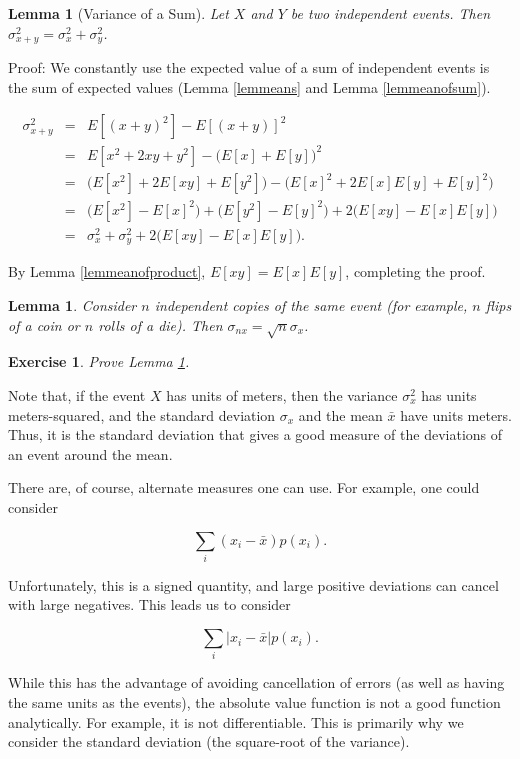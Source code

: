 \documentclass[12pt,letterpaper]{report}
\newcommand\be{\begin{equation}}
\newcommand\ee{\end{equation}}
\newcommand\bea{\begin{eqnarray}}
\newcommand\eea{\end{eqnarray}}
\newtheorem{lem}[thm]{Lemma}
\newtheorem{exe}[thm]{Exercise}
\begin{document}
\begin{lem}[Variance of a Sum] Let $X$ and $Y$ be two independent
events. Then $\sigma^2_{x+y} = \sigma^2_x + \sigma^2_y$.
\end{lem}

Proof: We constantly use the expected value of a sum of
independent events is the sum of expected values (Lemma
\ref{lemmeans} and Lemma \ref{lemmeanofsum}).

\bea \sigma^2_{x+y} &=& E[(x+y)^2] - E[(x+y)]^2 \nonumber\\ &=&
E[x^2 + 2xy + y^2] - \Big(E[x] + E[y]\Big)^2 \nonumber\\ &=&
\Big(E[x^2] + 2E[xy] + E[y^2]\Big) - \Big(E[x]^2 + 2E[x]E[y] +
E[y]^2\Big) \nonumber\\ &=& \Big(E[x^2] - E[x]^2\Big) +
\Big(E[y^2] - E[y]^2\Big) + 2\Big(E[xy] - E[x]E[y] \Big)
\nonumber\\ &=& \sigma^2_x + \sigma^2_y + 2\Big(E[xy] - E[x]E[y]
\Big). \eea

By Lemma \ref{lemmeanofproduct}, $E[xy] = E[x]E[y]$, completing
the proof.

\begin{lem}\label{lemumvariances} Consider $n$ independent copies of
the same event (for example, $n$ flips of a coin or $n$ rolls of a
die). Then $\sigma_{nx} = \sqrt{n} \sigma_x$.
\end{lem}

\begin{exe} Prove Lemma \ref{lemumvariances}. \end{exe}


Note that, if the event $X$ has units of meters, then the variance
$\sigma^2_x$ has units meters-squared, and the standard deviation
$\sigma_x$ and the mean $\bar{x}$ have units meters. Thus, it is
the standard deviation that gives a good measure of the deviations
of an event around the mean.

There are, of course, alternate measures one can use. For example,
one could consider

\be \sum_i (x_i - \bar{x}) p(x_i). \ee

Unfortunately, this is a signed quantity, and large positive
deviations can cancel with large negatives. This leads us to
consider

\be \sum_i |x_i - \bar{x}| p(x_i). \ee

While this has the advantage of avoiding cancellation of errors
(as well as having the same units as the events), the absolute
value function is not a good function analytically. For example,
it is not differentiable. This is primarily why we consider the
standard deviation (the square-root of the variance).
\end{document}
